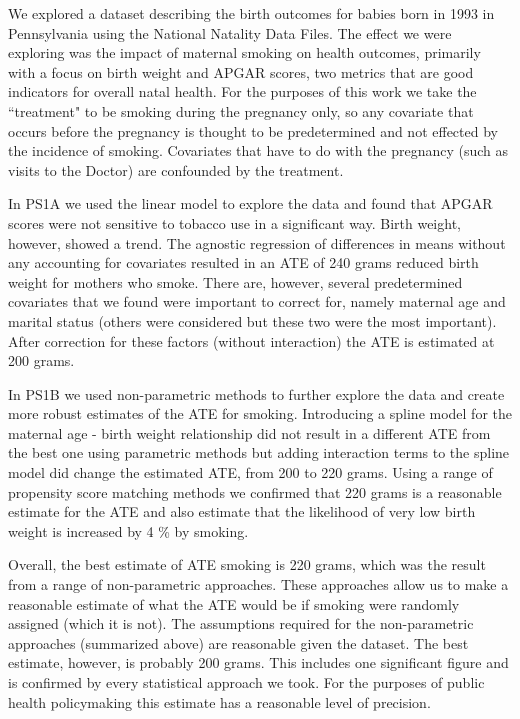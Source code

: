 We explored a dataset describing the birth outcomes for babies born in 1993 in Pennsylvania using the National Natality Data Files.  The effect we were exploring was the impact of maternal smoking on health outcomes, primarily with a focus on birth weight and APGAR scores, two metrics that are good indicators for overall natal health.  For the purposes of this work we take the ``treatment" to be smoking during the pregnancy only, so any covariate that occurs before the pregnancy is thought to be predetermined and not effected by the incidence of smoking.  Covariates that have to do with the pregnancy (such as visits to the Doctor) are confounded by the treatment.  

In PS1A we used the linear model to explore the data and found that APGAR scores were not sensitive to tobacco use in a significant way.  Birth weight, however, showed a trend.  The agnostic regression of differences in means without any accounting for covariates resulted in an ATE of 240 grams reduced birth weight for mothers who smoke.  There are, however, several predetermined covariates that we found were important to correct for, namely maternal age and marital status (others were considered but these two were the most important).  After correction for these factors (without interaction) the ATE is estimated at 200 grams.  

In PS1B we used non-parametric methods to further explore the data and create more robust estimates of the ATE for smoking.  Introducing a spline model for the maternal age - birth weight relationship did not result in a different ATE from the best one using parametric methods but adding interaction terms to the spline model did change the estimated ATE, from 200 to 220 grams.  Using a range of propensity score matching methods we confirmed that 220 grams is a reasonable estimate for the ATE and also estimate that the likelihood of very low birth weight is increased by 4 \% by smoking.  

Overall, the best estimate of ATE smoking is 220 grams, which was the result from a range of non-parametric approaches.  These approaches allow us to make a reasonable estimate of what the ATE would be if smoking were randomly assigned (which it is not).  The assumptions required for the non-parametric approaches (summarized above) are reasonable given the dataset.  The best estimate, however, is probably 200 grams.  This includes one significant figure and is confirmed by every statistical approach we took.  For the purposes of public health policymaking this estimate has a reasonable level of precision.